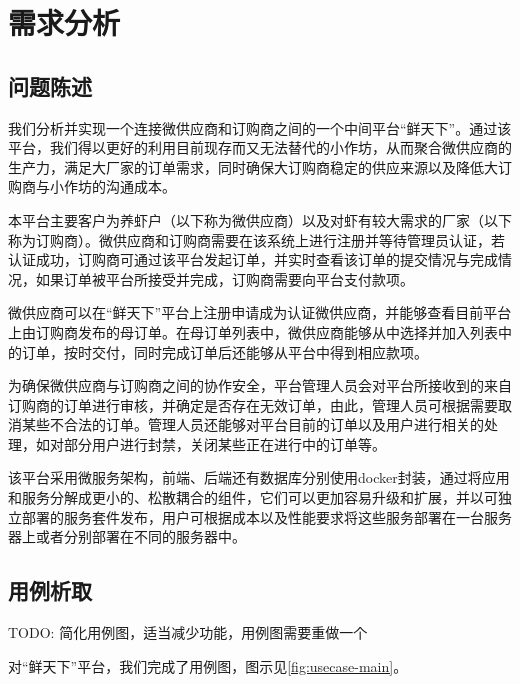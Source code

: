 \chapter{需求分析}

\label{cha:demand_analysis}
\section{问题陈述}


我们分析并实现一个连接微供应商和订购商之间的一个中间平台“鲜天下”。通过该平台，我们得以更好的利用目前现存而又无法替代的小作坊，从而聚合微供应商的生产力，满足大厂家的订单需求，同时确保大订购商稳定的供应来源以及降低大订购商与小作坊的沟通成本。

本平台主要客户为养虾户（以下称为微供应商）以及对虾有较大需求的厂家（以下称为订购商）。微供应商和订购商需要在该系统上进行注册并等待管理员认证，若认证成功，订购商可通过该平台发起订单，并实时查看该订单的提交情况与完成情况，如果订单被平台所接受并完成，订购商需要向平台支付款项。

微供应商可以在“鲜天下”平台上注册申请成为认证微供应商，并能够查看目前平台上由订购商发布的母订单。在母订单列表中，微供应商能够从中选择并加入列表中的订单，按时交付，同时完成订单后还能够从平台中得到相应款项。


为确保微供应商与订购商之间的协作安全，平台管理人员会对平台所接收到的来自订购商的订单进行审核，并确定是否存在无效订单，由此，管理人员可根据需要取消某些不合法的订单。管理人员还能够对平台目前的订单以及用户进行相关的处理，如对部分用户进行封禁，关闭某些正在进行中的订单等。


该平台采用微服务架构，前端、后端还有数据库分别使用docker封装，通过将应用和服务分解成更小的、松散耦合的组件，它们可以更加容易升级和扩展，并以可独立部署的服务套件发布，用户可根据成本以及性能要求将这些服务部署在一台服务器上或者分别部署在不同的服务器中。


\section{用例析取}

TODO: 简化用例图，适当减少功能，用例图需要重做一个

对“鲜天下”平台，我们完成了用例图，图示见\autoref{fig:usecase-main}。

